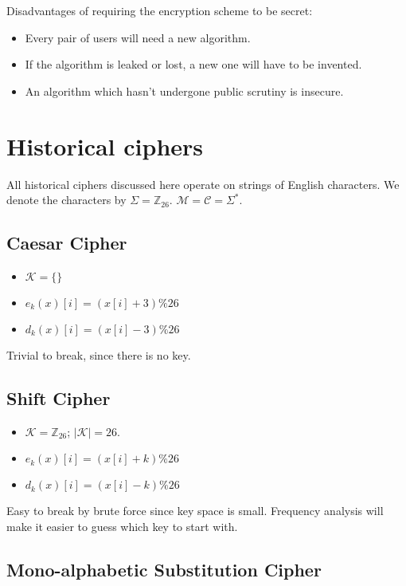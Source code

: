 Disadvantages of requiring the encryption scheme to be secret:

\begin{itemize}
\item Every pair of users will need a new algorithm.
\item If the algorithm is leaked or lost, a new one will have to be invented.
\item An algorithm which hasn't undergone public scrutiny is insecure.
\end{itemize}


\section{Historical ciphers}

All historical ciphers discussed here operate on strings of English characters.
We denote the characters by $\Sigma = \mathbb{Z}_{26}$.
$\mathcal{M} = \mathcal{C} = \Sigma^*$.

\subsection{Caesar Cipher}

\begin{itemize}
\item $\mathcal{K} = \{\}$
\item $e_k(x)[i] = (x[i]+3)\%26$
\item $d_k(x)[i] = (x[i]-3)\%26$
\end{itemize}

Trivial to break, since there is no key.

\subsection{Shift Cipher}

\begin{itemize}
\item $\mathcal{K} = \mathbb{Z}_{26}$; $|\mathcal{K}| = 26$.
\item $e_k(x)[i] = (x[i]+k)\%26$
\item $d_k(x)[i] = (x[i]-k)\%26$
\end{itemize}

Easy to break by brute force since key space is small.
Frequency analysis will make it easier to guess which key to start with.

\subsection{Mono-alphabetic Substitution Cipher}

